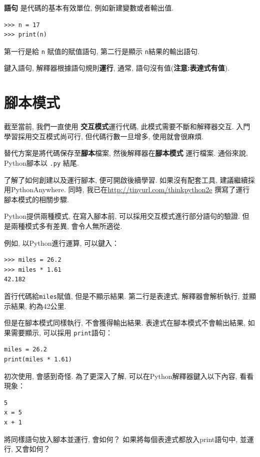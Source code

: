 \documentclass[10pt]{book}
\begin{document}
 {\bf 語句} 是代碼的基本有效單位, 例如新建變數或者輸出值. 

\begin{verbatim}
>>> n = 17
>>> print(n)
\end{verbatim}
%
第一行是給 {\tt n} 賦值的賦值語句, 第二行是顯示 {\tt n}結果的輸出語句. 

鍵入語句, 解釋器根據語句規則{\bf 運行}, 通常, 語句沒有值({\bf 注意:表達式有值}). 


\section{腳本模式}

截至當前, 我們一直使用 {\bf 交互模式}運行代碼, 
此模式需要不斷和解釋器交互. 
入門學習採用交互模式尚可行, 
但代碼行數一旦增多, 使用就會很麻煩. 

替代方案是將代碼保存至{\bf 腳本}檔案, 然後解釋器在{\bf 腳本模式}
運行檔案. 通俗來說, Python腳本以 {\tt .py} 結尾. 

了解了如何創建以及運行腳本, 便可開啟後續學習. 
如果沒有配套工具, 建議繼續採用PythonAnywhere. 
同時, 我已在\url{http://tinyurl.com/thinkpython2e}
撰寫了運行腳本模式的相關步驟. 

Python提供兩種模式, 在寫入腳本前, 
可以採用交互模式進行部分語句的驗證. 
但是兩種模式多有差異, 會令人無所適從. 

例如, 以Python進行運算, 可以鍵入：

\begin{verbatim}
>>> miles = 26.2
>>> miles * 1.61
42.182
\end{verbatim}

首行代碼給{\tt miles}賦值, 但是不顯示結果. 
第二行是表達式, 解釋器會解析執行, 並顯示結果, 約為42公里. 

但是在腳本模式同樣執行, 不會獲得輸出結果. 
表達式在腳本模式不會輸出結果, 如果需要顯示, 可以採用 {\tt print}語句：

\begin{verbatim}
miles = 26.2
print(miles * 1.61)
\end{verbatim}

初次使用, 會感到奇怪. 為了更深入了解, 
可以在Python解釋器鍵入以下內容, 看看現象：

\begin{verbatim}
5
x = 5
x + 1
\end{verbatim}

將同樣語句放入腳本並運行, 會如何？
如果將每個表達式都放入print語句中, 並運行, 又會如何？
\end{document}
